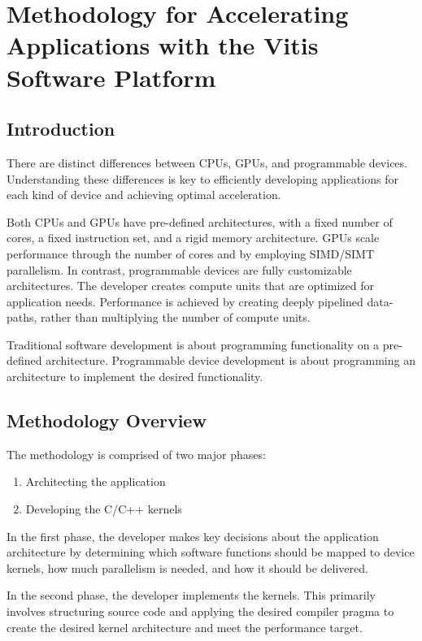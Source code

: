 \clearpage

\section{Methodology for Accelerating Applications with the Vitis Software Platform}
\subsection{Introduction} 
There are distinct differences between CPUs, GPUs, and programmable devices. Understanding these differences is key to efficiently developing applications for each kind of device and achieving optimal acceleration.

\par Both CPUs and GPUs have pre-defined architectures, with a fixed number of cores, a fixed instruction set, and a rigid memory architecture. GPUs scale performance through the number of cores and by employing SIMD/SIMT parallelism. In contrast, programmable devices are fully customizable architectures. The developer creates compute units that are optimized for application needs. Performance is achieved by creating deeply pipelined data-paths, rather than multiplying the number of compute units.

\begin{highlight}
    Traditional software development is about programming functionality on a pre-defined architecture. Programmable device development is about programming an architecture to implement the desired functionality.
\end{highlight}

\subsection{Methodology Overview}
The methodology is comprised of two major phases:
\begin{enumerate}
    \item Architecting the application
    \item Developing the C/C++ kernels
\end{enumerate}

In the first phase, the developer makes key decisions about the application architecture by determining which software functions should be mapped to device kernels, how much parallelism is needed, and how it should be delivered.

\par In the second phase, the developer implements the kernels. This primarily involves structuring source code and applying the desired compiler pragma to create the desired kernel architecture and meet the performance target.


